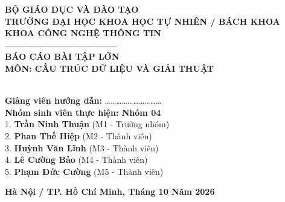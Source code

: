 \begin{titlepage}
\begin{center}
    \textbf{\large BỘ GIÁO DỤC VÀ ĐÀO TẠO}\\[0.3cm]
    \textbf{\large TRƯỜNG ĐẠI HỌC KHOA HỌC TỰ NHIÊN / BÁCH KHOA}\\[0.2cm]
    \textbf{\large KHOA CÔNG NGHỆ THÔNG TIN}\\[0.2cm]
    \textbf{-----------------------------------}\\[1.5cm]

    \vspace{1.0cm}
    \textbf{\LARGE BÁO CÁO BÀI TẬP LỚN}\\[0.5cm]
    \textbf{\Large MÔN: CẤU TRÚC DỮ LIỆU VÀ GIẢI THUẬT}\\[1.5cm]

    \\[2.0cm]

    \begin{flushleft}
        \hspace{1.5cm} \textbf{Giảng viên hướng dẫn:} \dots\dots\dots\dots\dots\dots\dots\dots\dots\dots\\[0.3cm]
        \hspace{1.5cm} \textbf{Nhóm sinh viên thực hiện: Nhóm 04}\\[0.2cm]
        \hspace{2.0cm} 1. \textbf{Trần Ninh Thuận} \quad (M1 - Trưởng nhóm)\\[0.15cm]
        \hspace{2.0cm} 2. \textbf{Phan Thế Hiệp} \quad (M2 - Thành viên)\\[0.15cm]
        \hspace{2.0cm} 3. \textbf{Huỳnh Văn Lĩnh} \quad (M3 - Thành viên)\\[0.15cm]
        \hspace{2.0cm} 4. \textbf{Lê Cường Bảo} \quad (M4 - Thành viên)\\[0.15cm]
        \hspace{2.0cm} 5. \textbf{Phạm Đức Cường} \quad (M5 - Thành viên)
    \end{flushleft}

    \vfill
    \textbf{Hà Nội / TP. Hồ Chí Minh, Tháng 10 Năm 2026}
\end{center}
\end{titlepage}
